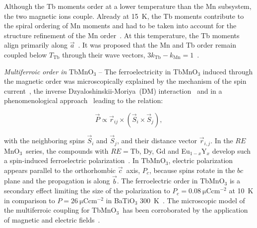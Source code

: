 \documentclass[aps,prb,twocolumn,superscriptaddress,showpacs,floatfix]{revtex4-2}
\newcommand{\tbmno}{TbMnO$_3$}
\newcommand{\DM}{Dzyaloshinskii-Moriya}
\newcommand{\aaxis}{$\vec{a}$}
\newcommand{\baxis}{$\vec{b}$}
\newcommand{\caxis}{$\vec{c}$}
\newcommand{\REmno}{$RE$MnO$_3$}
\begin{document}
Although the Tb moments order at a lower temperature than the Mn subsystem, the two magnetic ions couple. Already at \SI{15}{\kelvin}, the Tb moments contribute to the spiral ordering of Mn moments and had to be taken into account for the structure refinement of the Mn order~\cite{Kenzelmann2005}. At this temperature, the Tb moments align primarily along \aaxis~\cite{Kajimoto2004,Aliouane2009,Voigt2007,Prokhnenko2007}. It was proposed that the Mn and Tb order remain coupled below $T_{\textrm{Tb}}$ through their wave vectors, $3k_{\textrm{Tb}}-k_{\textrm{Mn}}=1$~\cite{Prokhnenko2007}.

{\it Multiferroic order in} TbMnO$_3$ -- The ferroelectricity in TbMnO$_3$ induced through the magnetic order was microscopically explained by the mechanism of the spin current~\cite{Katsura2005}, the inverse \DM\ (DM) interaction~\cite{Sergienko2006} and in a phenomenological approach~\cite{Mostovoy2006} leading to the relation:

\begin{equation}
\vec{P}\propto\vec{r}_{ij}\times(\vec{S}_i\times\vec{S}_j),
\end{equation}

with the neighboring spins $\vec{S}_i$ and $\vec{S}_j$, and their distance vector $\vec{r}_{i,j}$. In the \REmno\ series, the compounds with $RE=$Tb, Dy, Gd and Eu$_{1-x}$Y$_x$ develop such a spin-induced ferroelectric polarization~\cite{Kimura2003,Goto2004,Noda2006,Arima2006,Kuwahara2009,Fontcuberta2015}.
In \tbmno,  electric polarization appears parallel to the orthorhombic \caxis\ axis, $P_c$, because spins rotate in the $bc$ plane and the propagation is along \baxis . The ferroelectric order in TbMnO$_3$ is a secondary effect limiting the size of the polarization to $P_c=\SI{0.08}{\micro\coulomb\cm\tothe{-2}}$ at \SI{10}{\kelvin} in comparison to $P = \SI{26}{\micro\coulomb\cm\tothe{-2}}$ in BaTiO$_3$ \SI{300}{\kelvin}~\cite{Merz1953}. The microscopic model of the multiferroic coupling for \tbmno\ has been corroborated
by the application of magnetic and electric fields~\cite{Kimura2005,Yamasaki2007,Aliouane2009}.
\end{document}
